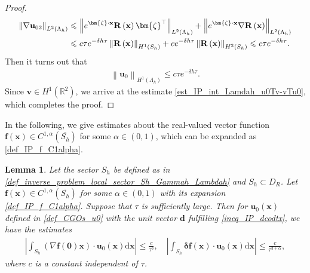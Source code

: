\documentclass[11pt,reqno,oneside]{amsart}
\newtheorem{lemma}{Lemma}[section]
\theoremstyle{definition}
\theoremstyle{remark}
\numberwithin{equation}{section}
\numberwithin{equation}{section}
\theoremstyle{remark}
\begin{document}
\begin{proof}
\begin{align*}
		\left\| \nabla\mathbf{u}_{02} \right\|_{L^2 \left(\Lambda_h\right)} & \leqslant \left\| e^{\bm{\zeta} \cdot \mathbf{x}} \mathbf{R}\left(\mathbf{x}\right) \bm{\zeta}^{\top} \right\|_{L^2 \left(\Lambda_h\right)} + \left\| e^{\bm{\zeta} \cdot \mathbf{x}} \nabla\mathbf{R}\left(\mathbf{x}\right) \right\|_{L^2 \left(\Lambda_h\right)} \notag \\
		& \leqslant c \tau e^{-\delta h \tau} \left\| \mathbf{R}\left(\mathbf{x}\right) \right\|_{H^1 \left(S_h\right)}	+ ce^{-\delta h \tau} \left\| \mathbf{R}\left(\mathbf{x}\right) \right\|_{H^2 \left(S_h\right)} \leqslant c \tau e^{-\delta h \tau}.
	\end{align*}
	Then it turns out that
	\begin{align*} 
		\left\| \mathbf{u}_0 \right\|_{H^1 \left(\Lambda_h\right)} \leqslant c \tau e^{-\delta h \tau}.
	\end{align*}
	Since $ \mathbf{v} \in H^1\left(\mathbb{R}^2\right) $, we arrive at the estimate \eqref{est_IP_int_Lamdah_u0Tv-vTu0}, which completes the proof.
\end{proof}


In the following, we give estimates about the real-valued vector function $ \mathbf{f}\left(\mathbf{x}\right)\in C^{1,\alpha}\left(\overline{S_h}\right) $ for some $ \alpha\in\left(0,1\right) $, which can be expanded as \eqref{def_IP_f_C1alpha}.

\begin{lemma} \label{lem_IP_est_int_Sh_xu0_int_Sh_delatfu0}
	Let the sector $ S_h $ be defined as in \eqref{def_inverse_problem_local_sector_Sh_Gammah_Lambdah} and $ S_h\subset D_R $. Let $ \mathbf{f}\left(\mathbf{x}\right)\in C^{1,\alpha}\left(\overline{S_h}\right) $ for some $ \alpha\in\left(0,1\right) $ with its expansion \eqref{def_IP_f_C1alpha}. Suppose that $ \tau $ is sufficiently large. Then for $ \mathbf{u}_0\left(\mathbf{x}\right) $ defined in \eqref{def_CGOs_u0} with the unit vector $ \mathbf{d} $ fulfilling \eqref{ineq_IP_dcodtx}, we have the estimates
	\begin{align} \label{est_IP_int_Sh_gradientf0xu0}
		\left| \int_{S_h} \left(\nabla \mathbf{f} \left(\bm{0}\right) \mathbf{x}\right) \cdot \mathbf{u}_0\left(\mathbf{x}\right) \mathrm{d}\mathbf{x} \right| \leqslant \frac{c}{\tau^3} ,\quad
		\left| \int_{S_h} \bm{\delta} \mathbf{f} \left(\mathbf{x}\right) \cdot \mathbf{u}_0\left(\mathbf{x}\right) \mathrm{d}\mathbf{x} \right| \leqslant \frac{c}{\tau^{3+\alpha}} ,
	\end{align}
	where $ c $ is a constant independent of $ \tau $.
\end{lemma}
\end{document}

